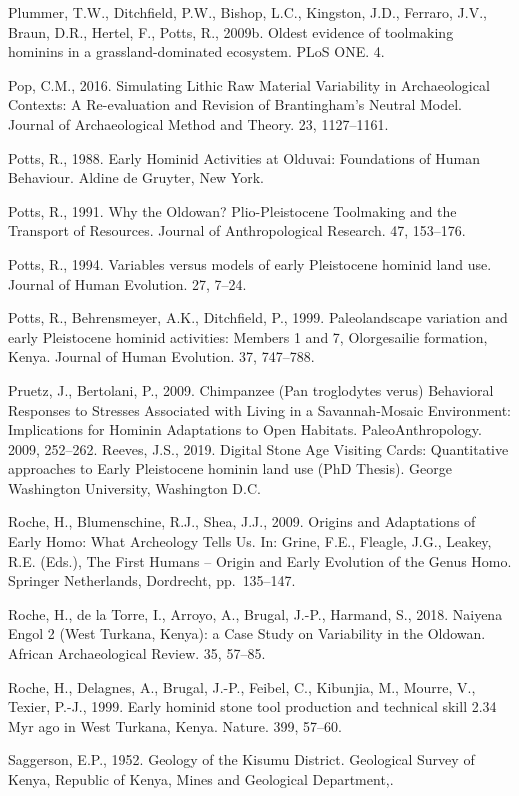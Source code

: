 \documentclass[]{elsarticle} %
\begin{document}
Plummer, T.W., Ditchfield, P.W., Bishop, L.C., Kingston, J.D., Ferraro,
J.V., Braun, D.R., Hertel, F., Potts, R., 2009b. Oldest evidence of
toolmaking hominins in a grassland-dominated ecosystem. PLoS ONE. 4.

Pop, C.M., 2016. Simulating Lithic Raw Material Variability in
Archaeological Contexts: A Re-evaluation and Revision of Brantingham's
Neutral Model. Journal of Archaeological Method and Theory. 23,
1127--1161.

Potts, R., 1988. Early Hominid Activities at Olduvai: Foundations of
Human Behaviour. Aldine de Gruyter, New York.

Potts, R., 1991. Why the Oldowan? Plio-Pleistocene Toolmaking and the
Transport of Resources. Journal of Anthropological Research. 47,
153--176.

Potts, R., 1994. Variables versus models of early Pleistocene hominid
land use. Journal of Human Evolution. 27, 7--24.

Potts, R., Behrensmeyer, A.K., Ditchfield, P., 1999. Paleolandscape
variation and early Pleistocene hominid activities: Members 1 and 7,
Olorgesailie formation, Kenya. Journal of Human Evolution. 37, 747--788.

Pruetz, J., Bertolani, P., 2009. Chimpanzee (Pan troglodytes verus)
Behavioral Responses to Stresses Associated with Living in a
Savannah-Mosaic Environment: Implications for Hominin Adaptations to
Open Habitats. PaleoAnthropology. 2009, 252--262. Reeves, J.S., 2019.
Digital Stone Age Visiting Cards: Quantitative approaches to Early
Pleistocene hominin land use (PhD Thesis). George Washington University,
Washington D.C.

Roche, H., Blumenschine, R.J., Shea, J.J., 2009. Origins and Adaptations
of Early Homo: What Archeology Tells Us. In: Grine, F.E., Fleagle, J.G.,
Leakey, R.E. (Eds.), The First Humans -- Origin and Early Evolution of
the Genus Homo. Springer Netherlands, Dordrecht, pp.~135--147.

Roche, H., de la Torre, I., Arroyo, A., Brugal, J.-P., Harmand, S.,
2018. Naiyena Engol 2 (West Turkana, Kenya): a Case Study on Variability
in the Oldowan. African Archaeological Review. 35, 57--85.

Roche, H., Delagnes, A., Brugal, J.-P., Feibel, C., Kibunjia, M.,
Mourre, V., Texier, P.-J., 1999. Early hominid stone tool production and
technical skill 2.34 Myr ago in West Turkana, Kenya. Nature. 399,
57--60.

Saggerson, E.P., 1952. Geology of the Kisumu District. Geological Survey
of Kenya, Republic of Kenya, Mines and Geological Department,.
\end{document}
